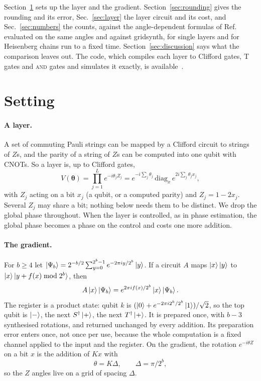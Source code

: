 \documentclass[aps,prx,twocolumn,superscriptaddress,nofootinbib,longbibliography]{revtex4-2}
\theoremstyle{remark}
\newcommand{\AND}{\textup{\textsc{and}}}
\begin{document}
Section~\ref{sec:setting} sets up the layer and the gradient. Section~\ref{sec:rounding} gives
the rounding and its error, Sec.~\ref{sec:layer} the layer circuit and its cost, and
Sec.~\ref{sec:numbers} the counts, against the angle-dependent formulas of
Ref.~\cite{Bothe2026} evaluated on the same angles and against gridsynth, for single layers and
for Heisenberg chains run to a fixed time. Section~\ref{sec:discussion} says what the comparison
leaves out. The code, which compiles each layer to Clifford gates, T gates and \AND{} gates and
simulates it exactly, is available~\cite{code}.

\section{Setting}\label{sec:setting}

\paragraph*{A layer.}
A set of commuting Pauli strings can be mapped by a Clifford circuit to strings of $Z$s, and the
parity of a string of $Z$s can be computed into one qubit with CNOTs. So a layer is, up to
Clifford gates,
\begin{equation}\label{eq:layer}
  V(\boldsymbol\theta)=\prod_{j=1}^Le^{-i\theta_jZ_j}
  =e^{-i\sum_j\theta_j}\,\mathrm{diag}_x\,e^{2i\sum_j\theta_jx_j},
\end{equation}
with $Z_j$ acting on a bit $x_j$ (a qubit, or a computed parity) and
$Z_j=1-2x_j$. Several $Z_j$ may share a bit; nothing below needs them to be distinct. We drop
the global phase throughout. When the layer is controlled, as in phase estimation, the global
phase becomes a phase on the control and costs one more addition.

\paragraph*{The gradient.}
For $b\ge4$ let $\ket{\Psi_b}=2^{-b/2}\sum_{y=0}^{2^b-1}e^{-2\pi iy/2^b}\ket{y}$. If a circuit
$A$ maps $\ket{x}\ket{y}$ to $\ket{x}\ket{y+f(x)\bmod2^b}$, then
\begin{equation}\label{eq:kickback}
  A\ket{x}\ket{\Psi_b}=e^{2\pi if(x)/2^b}\ket{x}\ket{\Psi_b}.
\end{equation}
The register is a product state: qubit $k$ is $(\ket0+e^{-2\pi i2^k/2^b}\ket1)/\sqrt2$, so the top
qubit is $\ket-$, the next $S^\dagger\ket+$, the next $T^\dagger\ket+$. It is prepared once, with
$b-3$ synthesised rotations, and returned unchanged by every addition. Its preparation error
enters once, not once per use, because the whole computation is a fixed channel applied to the
input and the register. On the gradient, the rotation $e^{-i\theta Z}$ on a bit $x$ is the
addition of $Kx$ with
\begin{equation}\label{eq:grid}
  \theta=K\Delta,\qquad \Delta=\pi/2^b,
\end{equation}
so the $Z$ angles live on a grid of spacing $\Delta$.
\end{document}
